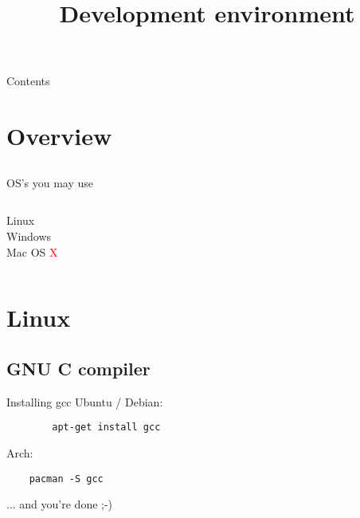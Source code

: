 
\newcommand{\topic}{
	Development environment
}


\title{\topic}
\supertitle{\course}
\date{}



\maketitle

\begin{frame}{Contents}
	\tableofcontents
\end{frame}

\section{Overview}
\subsection{}
\begin{frame}{OS's you may use}
	\begin{columns}[T]
		Linux\\
		\uncover<2->{\textcolor{green}{recommended}}
		Windows\\
		\uncover<3->{\textcolor{orange}{supported}}
		Mac OS \textcolor<4->{red}{X}
	\end{columns}
\end{frame}
\section{Linux}
\subsection{GNU C compiler}
\begin{frame}[fragile]{Installing gcc}
	Ubuntu / Debian: 
	\begin{lstlisting}
		apt-get install gcc
	\end{lstlisting}
	Arch:
	\begin{lstlisting}
	pacman -S gcc
	\end{lstlisting}
	... and you're done ;-)
\end{frame}
